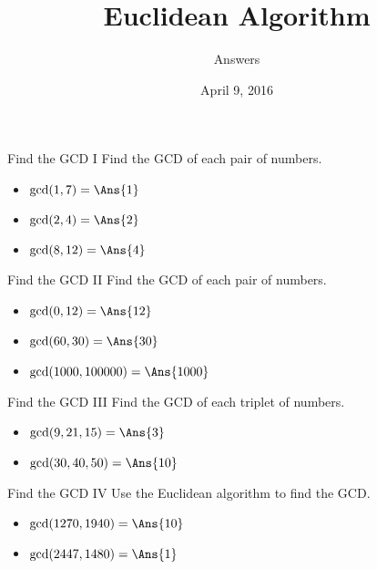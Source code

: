 \documentclass[12pt,letterpaper]{article}
\title{Euclidean Algorithm}
\author{Answers}
\date{April 9, 2016}
\begin{document}
\maketitle

\thispagestyle{empty}

\begin{problem}{Find the GCD I}
 Find the GCD of each pair of numbers.

 \begin{itemize}
  \item $\gcd(1, 7) = \Ans{1}$
  \item $\gcd(2, 4) = \Ans{2}$
  \item $\gcd(8, 12) = \Ans{4}$
 \end{itemize}
\end{problem}

\begin{problem}{Find the GCD II}
 Find the GCD of each pair of numbers.

 \begin{itemize}
  \item $\gcd(0, 12) = \Ans{12}$
  \item $\gcd(60, 30) = \Ans{30}$
  \item $\gcd(1000, 100000) = \Ans{1000}$
 \end{itemize}
\end{problem}

\begin{problem}{Find the GCD III}
 Find the GCD of each triplet of numbers.

 \begin{itemize}
  \item $\gcd(9, 21, 15) = \Ans{3}$
  \item $\gcd(30, 40, 50) = \Ans{10}$
 \end{itemize}
\end{problem}

\begin{problem}{Find the GCD IV}
 Use the Euclidean algorithm to find the GCD.

 \begin{itemize}
  \item $\gcd(1270, 1940) = \Ans{10}$
  \item $\gcd(2447, 1480) = \Ans{1}$
 \end{itemize}
\end{problem}
\end{document}
